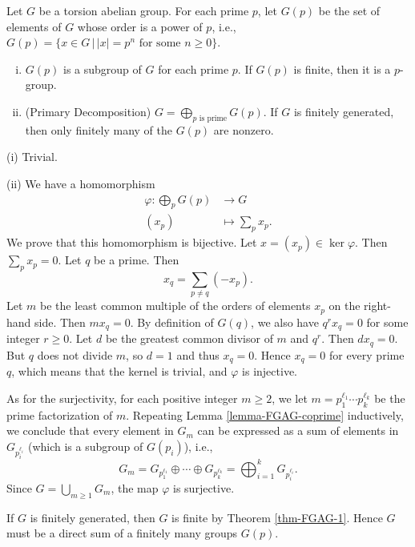 \begin{theorem} \label{thm-1.3.9}
	Let $G$ be a torsion abelian group. For each prime $p$, let $G(p)$ be the set of elements of $G$ whose order is a power of $p$, i.e., $G(p) = \{x\in G\,|\, |x|=p^n\text{ for some }n\geq 0\}$.
	\begin{enumerate}[(i)]
		\item $G(p)$ is a subgroup of $G$ for each prime $p$. If $G(p)$ is finite, then it is a $p$-group.
		\item (Primary Decomposition) $G =  \bigoplus_{p\text{ is prime}} G(p)$. If $G$ is finitely generated, then only finitely many of the $G(p)$ are nonzero.
	\end{enumerate}
\end{theorem}
\begin{sketch}
	(i) Trivial.
	
	(ii)  We have a homomorphism
	\begin{align*}
		\varphi: \bigoplus_p G(p) &\rightarrow G
		\\
		(x_p) &\mapsto \sum_p x_p.
	\end{align*}
 We prove that this homomorphism is bijective. Let $x = (x_p)\in \ker \varphi$. Then $\sum_p x_p = 0$. Let $q$ be a prime.  Then
	$$ x_q =  \sum_{p \neq q} (-x_p). $$
	Let $m$ be the least common multiple of the orders of elements $x_p$ on the right-hand side. Then $mx_q = 0$. By definition of $G(q)$, we also have $q^r x_q = 0$ for some integer $r\geq 0$. Let $d$ be the greatest common divisor of $m$ and $q^r$. Then $dx_q = 0$. But $q$ does not divide $m$, so $d=1$ and thus $x_q = 0$. Hence $x_q = 0$ for every prime $q$, which means that the kernel is trivial, and $\varphi$ is injective.
	
	As for the surjectivity, for each positive integer $m\geq 2$, we let $m = p_1^{\ell_1}\cdots p_k^{\ell_k}$ be the prime factorization of $m$.    Repeating Lemma \ref{lemma-FGAG-coprime} inductively, we conclude that every element in $G_m$ can be expressed as a sum of elements in $G_{p_i^{\ell_i}}$ (which is a subgroup of $G(p_i)$), i.e., 
	$$  G_m = G_{p_1^{\ell_1}} \oplus \cdots \oplus G_{p_k^{\ell_k}} =\bigoplus_{i=1}^k G_{p_i^{\ell_i}}. $$
	Since $G = \bigcup_{m\geq 1} G_m$, the map $\varphi$ is surjective.
	
	If $G$ is finitely generated, then $G$ is finite by Theorem \ref{thm-FGAG-1}. Hence $G$ must be a direct sum of a finitely many groups $G(p)$.
\end{sketch}


